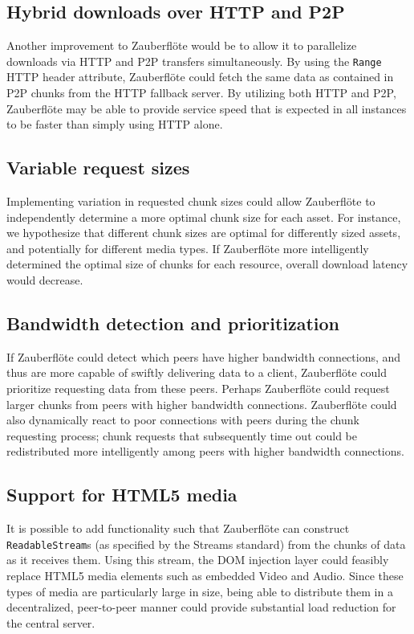 \documentclass[letterpaper,twocolumn,10pt]{article}
\newcommand{\zbf}{Zauberfl\"{o}te\xspace}
\begin{document}
\subsection{Hybrid downloads over HTTP and P2P}

Another improvement to \zbf would be to allow it to parallelize downloads via HTTP and P2P transfers simultaneously. By using the \texttt{Range} HTTP header attribute, \zbf could fetch the same data as contained in P2P chunks from the HTTP fallback server. By utilizing both HTTP and P2P, \zbf may be able to provide service speed that is expected in all instances to be faster than simply using HTTP alone.

\subsection{Variable request sizes}

Implementing variation in requested chunk sizes could allow \zbf to independently
determine a more optimal chunk size for each asset. For instance, we hypothesize
that different chunk sizes are optimal for differently sized assets, and potentially
for different media types. If \zbf more intelligently determined the optimal size
of chunks for each resource, overall download latency would decrease.

\subsection{Bandwidth detection and prioritization}

If \zbf could detect which peers have higher bandwidth connections, and thus
are more capable of swiftly delivering data to a client, \zbf could prioritize
requesting data from these peers. Perhaps \zbf could request larger chunks from
peers with higher bandwidth connections. \zbf could also dynamically react to
poor connections with peers during the chunk requesting process; chunk requests
that subsequently time out could be redistributed more intelligently among
peers with higher bandwidth connections.

\subsection{Support for HTML5 media}
It is possible to add functionality such that \zbf can construct
\texttt{ReadableStream}s (as specified by the Streams standard)
from the chunks of data as it receives them. Using this stream, the DOM injection
layer could feasibly replace HTML5 media elements such as embedded Video and Audio.
Since these types of media are particularly large in size, being able to distribute
them in a decentralized, peer-to-peer manner could provide substantial load
reduction for the central server.
\end{document}
